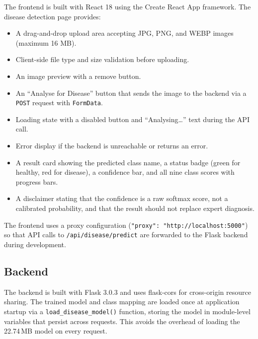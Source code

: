 \documentclass[conference]{IEEEtran}
\begin{document}
The frontend is built with React 18 using the Create React App framework. The disease detection page provides:
\begin{itemize}
    \item A drag-and-drop upload area accepting JPG, PNG, and WEBP images (maximum 16 MB).
    \item Client-side file type and size validation before uploading.
    \item An image preview with a remove button.
    \item An ``Analyse for Disease'' button that sends the image to the backend via a \texttt{POST} request with \texttt{FormData}.
    \item Loading state with a disabled button and ``Analysing\ldots'' text during the API call.
    \item Error display if the backend is unreachable or returns an error.
    \item A result card showing the predicted class name, a status badge (green for healthy, red for disease), a confidence bar, and all nine class scores with progress bars.
    \item A disclaimer stating that the confidence is a raw softmax score, not a calibrated probability, and that the result should not replace expert diagnosis.
\end{itemize}

The frontend uses a proxy configuration (\texttt{"proxy": "http://localhost:5000"}) so that API calls to \texttt{/api/disease/predict} are forwarded to the Flask backend during development.

\subsection{Backend}

The backend is built with Flask 3.0.3 and uses flask-cors for cross-origin resource sharing. The trained model and class mapping are loaded once at application startup via a \texttt{load\_disease\_model()} function, storing the model in module-level variables that persist across requests. This avoids the overhead of loading the 22.74\,MB model on every request.
\end{document}
